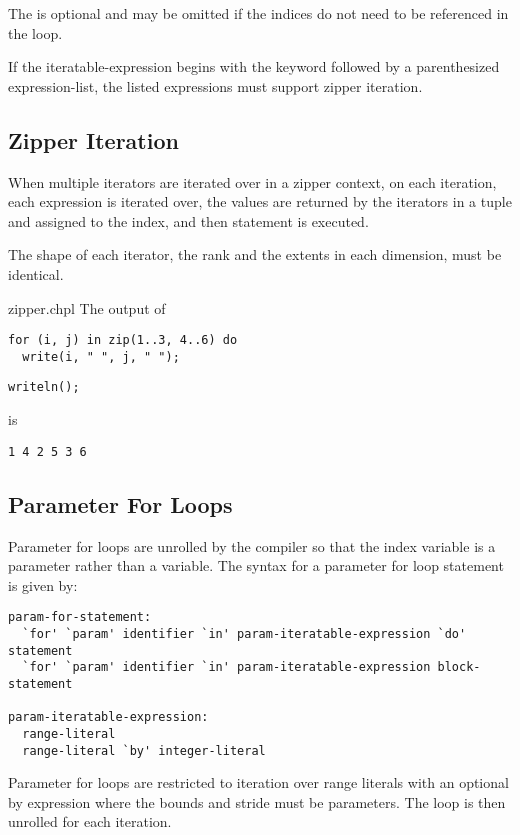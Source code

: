 The  is optional and may be omitted if the
indices do not need to be referenced in the loop.

If the iteratable-expression begins with the keyword  followed
by a parenthesized expression-list, the listed expressions must support
zipper iteration.

\subsection{Zipper Iteration}
\label{Zipper_Iteration}

When multiple iterators are iterated over in a zipper context, on each
iteration, each expression is iterated over, the values are returned
by the iterators in a tuple and assigned to the index, and then
statement is executed.

The shape of each iterator, the rank and the extents in each
dimension, must be identical.

\begin{chapelexample}{zipper.chpl}
The output of
\begin{chapel}
\begin{verbatim}
for (i, j) in zip(1..3, 4..6) do
  write(i, " ", j, " ");
\end{verbatim}
\end{chapel}
\begin{chapelpost}
\begin{verbatim}
writeln();
\end{verbatim}
\end{chapelpost}
is
\begin{chapelprintoutput}
\begin{verbatim}
1 4 2 5 3 6 
\end{verbatim}
\end{chapelprintoutput}
\end{chapelexample}

\subsection{Parameter For Loops}
\label{Parameter_For_Loops}

Parameter for loops are unrolled by the compiler so that the index
variable is a parameter rather than a variable.  The syntax for a
parameter for loop statement is given by:
\begin{syntax}
\begin{verbatim}
param-for-statement:
  `for' `param' identifier `in' param-iteratable-expression `do' statement
  `for' `param' identifier `in' param-iteratable-expression block-statement

param-iteratable-expression:
  range-literal
  range-literal `by' integer-literal
\end{verbatim}
\end{syntax}
Parameter for loops are restricted to iteration over range literals
with an optional by expression where the bounds and stride must be
parameters.  The loop is then unrolled for each iteration.

